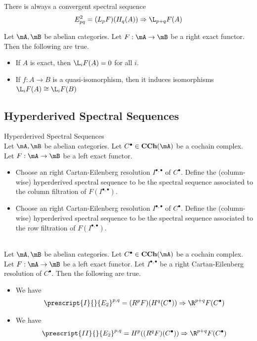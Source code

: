 \documentclass[a4paper]{article}
\begin{document}
\begin{prp}{}{} There is always a convergent spectral sequence $$E_{pq}^2=(L_pF)(H_q(A))\Rightarrow\L_{p+q}F(A)$$
\end{prp}

\begin{crl}{}{} Let $\mA,\mB$ be abelian categories. Let $F:\mA\to\mB$ be a right exact functor. Then the following are true. 
\begin{itemize}
\item If $A$ is exact, then $\L_iF(A)=0$ for all $i$. 
\item If $f:A\to B$ is a quasi-isomorphism, then it induces isomorphisms $\L_iF(A)\cong\L_iF(B)$
\end{itemize}
\end{crl}

\subsection{Hyperderived Spectral Sequences}
\begin{defn}{Hyperderived Spectral Sequences}{}\\
Let $\mA,\mB$ be abelian categories. Let $C^\bullet\in\bold{CCh}(\mA)$ be a cochain complex. Let $F:\mA\to\mB$ be a left exact functor. 
\begin{itemize}
\item Choose an right Cartan-Eilenberg resolution $I^{\bullet,\bullet}$ of $C^\bullet$. Define the (column-wise) hyperderived spectral sequence to be the spectral sequence associated to the column filtration of $F(I^{\bullet,\bullet})$. 
\item Choose an right Cartan-Eilenberg resolution $I^{\bullet,\bullet}$ of $C^\bullet$. Define the (column-wise) hyperderived spectral sequence to be the spectral sequence associated to the row filtration of $F(I^{\bullet,\bullet})$. 
\end{itemize}
\end{defn}

\begin{prp}{}{}\\
Let $\mA,\mB$ be abelian categories. Let $C^\bullet\in\bold{CCh}(\mA)$ be a cochain complex. Let $F:\mA\to\mB$ be a left exact functor. Let $I^{\bullet,\bullet}$ be a right Cartan-Eilenberg resolution of $C^\bullet$. Then the following are true. 
\begin{itemize}
\item We have $$\prescript{I}{}{E_2}^{p,q}=(R^pF)(H^q(C^\bullet))\Rightarrow\R^{p+q}F(C^\bullet)$$
\item We have $$\prescript{II}{}{E_2}^{p,q}=H^p((R^qF)(C^\bullet))\Rightarrow\R^{p+q}F(C^\bullet)$$
\end{itemize}
\end{prp}
\end{document}

